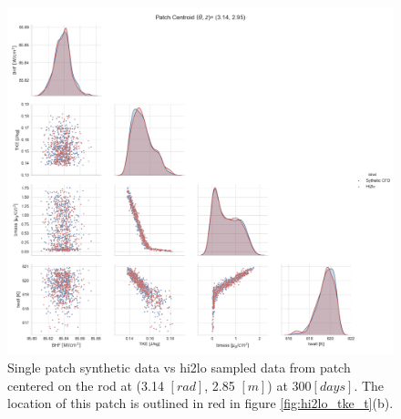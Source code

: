 \begin{figure}[H]
    \centering
    \includegraphics[width=0.99\linewidth]{figs/synth/patch_scatter_0_4_0_6}
    \caption[Single patch synthetic CFD data vs hi2lo sampled data.]{Single patch synthetic data vs hi2lo sampled data from patch centered on the rod at (3.14 $[rad]$, 2.85 $[m]$) at 300$[days]$.  The location of this patch is outlined in red in figure \ref{fig:hi2lo_tke_t}(b).}
    \label{fig:patchscatter}
\end{figure}


